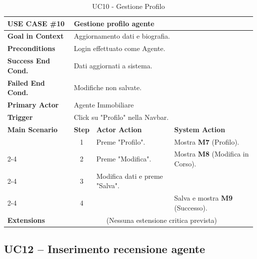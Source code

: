 \documentclass[a4paper,11pt]{report}
\begin{document}
\begin{table}[ht]
\centering
\small
\setlength{\tabcolsep}{3pt}
\renewcommand{\arraystretch}{1.3}
\noindent
\begin{tabularx}{\linewidth}{|p{3cm}|c|X|X|}
\hline
\textbf{USE CASE \#10} & \multicolumn{3}{l|}{\textbf{Gestione profilo agente}} \\ \hline
\textbf{Goal in Context} & \multicolumn{3}{l|}{Aggiornamento dati e biografia.} \\ \hline
\textbf{Preconditions} & \multicolumn{3}{l|}{Login effettuato come Agente.} \\ \hline
\textbf{Success End Cond.} & \multicolumn{3}{l|}{Dati aggiornati a sistema.} \\ \hline
\textbf{Failed End Cond.} & \multicolumn{3}{l|}{Modifiche non salvate.} \\ \hline
\textbf{Primary Actor} & \multicolumn{3}{l|}{Agente Immobiliare} \\ \hline
\textbf{Trigger} & \multicolumn{3}{l|}{Click su "Profilo" nella Navbar.} \\ \hline
\textbf{Main Scenario} & \textbf{Step} & \textbf{Actor Action} & \textbf{System Action} \\ \hline 
 & 1 & Preme "Profilo". & Mostra \textbf{M7} (Profilo). \\ \cline{2-4} 
 & 2 & Preme "Modifica". & Mostra \textbf{M8} (Modifica in Corso). \\ \cline{2-4} 
 & 3 & Modifica dati e preme "Salva". &  \\ \cline{2-4} 
 & 4 & & Salva e mostra \textbf{M9} (Successo). \\ \hline
\textbf{Extensions} & \multicolumn{3}{c|}{(Nessuna estensione critica prevista)} \\ \hline
\end{tabularx}
\caption{UC10 - Gestione Profilo}
\end{table}

\pagebreak

\subsection*{UC12 -- Inserimento recensione agente}
\end{document}

